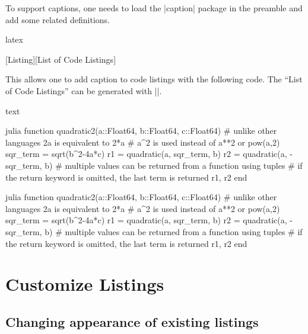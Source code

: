 \documentclass[letterpaper, 11pt, DIV=11]{scrartcl}
\newenvironment{mylisting}{\medskip\captionsetup{type=listing, labelsep=colon}}{\medskip}
\begin{document}
To support captions, one needs to load the \rawinline|caption| package in the preamble and add some related definitions. 

\begin{tcbsrccode}{latex}
\usepackage{caption}

\newenvironment{mylisting}{\medskip\captionsetup{type=listing, labelsep=space}}{\medskip}
[Listing][List of Code Listings]
\end{tcbsrccode}

This allows one to add caption to code listings with the following code. The ``List of Code Listings'' can be generated with \texinline|\listoflstcaps|.

\begin{tcbsrccode}{text}
\begin{mylisting}
\begin{tcbcode*}{julia}
function quadratic2(a::Float64, b::Float64, c::Float64)
    # unlike other languages 2a is equivalent to 2*a
    # a^2 is used instead of a**2 or pow(a,2)
    sqr_term = sqrt(b^2-4a*c)
    r1 = quadratic(a, sqr_term, b)
    r2 = quadratic(a, -sqr_term, b)
    # multiple values can be returned from a function using tuples
    # if the return keyword is omitted, the last term is returned
    r1, r2
end
\end{tcbcode*}
\end{mylisting}
\listoflstcaps
\end{tcbsrccode}

\begin{mylisting}
\begin{tcbcode*}{julia}
function quadratic2(a::Float64, b::Float64, c::Float64)
    # unlike other languages 2a is equivalent to 2*a
    # a^2 is used instead of a**2 or pow(a,2)
    sqr_term = sqrt(b^2-4a*c)
    r1 = quadratic(a, sqr_term, b)
    r2 = quadratic(a, -sqr_term, b)
    # multiple values can be returned from a function using tuples
    # if the return keyword is omitted, the last term is returned
    r1, r2
end
\end{tcbcode*}
\end{mylisting}
\listoflstcaps


\section{Customize Listings}

\subsection{Changing appearance of existing listings}
\end{document}
